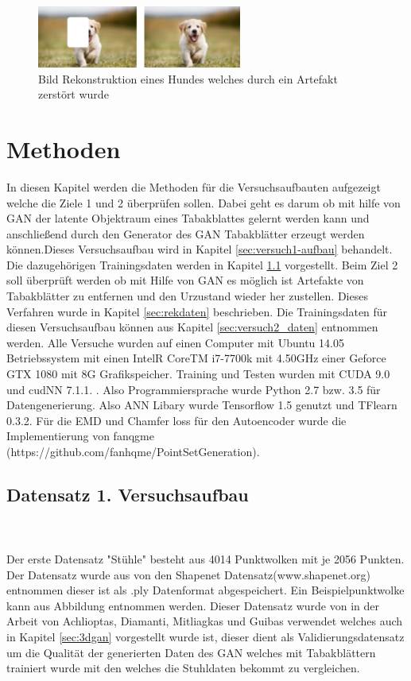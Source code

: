 \documentclass{llncs}
\begin{document}
\begin{figure}[htbp] 
	\centering
	\includegraphics[width=0.6\textwidth]{imagere.png}
	\caption{Bild Rekonstruktion eines Hundes welches durch ein Artefakt zerstört wurde}
	\label{fig:Bild40}
\end{figure}
\newpage
\section{Methoden}

In diesen Kapitel werden die Methoden für die Versuchsaufbauten aufgezeigt welche die Ziele 1 und 2 überprüfen sollen. Dabei geht es darum ob mit hilfe von GAN der latente Objektraum eines Tabakblattes gelernt werden kann und anschließend durch den Generator des GAN Tabakblätter erzeugt werden können.Dieses Versuchsaufbau wird in Kapitel \ref{sec:versuch1-aufbau} behandelt. Die dazugehörigen Trainingsdaten werden in Kapitel \ref{sec:versuch1-traingsdaten} vorgestellt. Beim Ziel 2 soll überprüft werden ob mit Hilfe von GAN es möglich ist Artefakte von Tabakblätter zu entfernen und den Urzustand wieder her zustellen.  Dieses Verfahren wurde in Kapitel \ref{sec:rekdaten} beschrieben. Die Trainingsdaten für diesen Versuchsaufbau können aus Kapitel \ref{sec:versuch2_daten} entnommen werden. Alle Versuche wurden auf einen Computer mit Ubuntu 14.05 Betriebssystem mit einen IntelR CoreTM i7-7700k mit 4.50GHz einer Geforce GTX 1080 mit 8G Grafikspeicher. Training und Testen wurden mit CUDA 9.0 und cudNN 7.1.1. . Also Programmiersprache wurde Python 2.7 bzw. 3.5 für Datengenerierung. Also ANN Libary wurde Tensorflow 1.5 genutzt und TFlearn 0.3.2. Für die EMD und Chamfer loss für den Autoencoder wurde die Implementierung von fanqgme (https://github.com/fanhqme/PointSetGeneration).


\subsection{Datensatz 1. Versuchsaufbau}\label{sec:versuch1-traingsdaten}
~\\\\
Der erste Datensatz "Stühle" besteht aus 4014 Punktwolken mit je 2056 Punkten. Der Datensatz wurde aus von den Shapenet Datensatz(www.shapenet.org) entnommen dieser ist als .ply Datenformat abgespeichert. Ein Beispielpunktwolke kann aus Abbildung entnommen werden. Dieser Datensatz wurde von  in der Arbeit von Achlioptas, Diamanti, Mitliagkas und Guibas\cite{3dgan} verwendet welches auch in Kapitel \ref{sec:3dgan} vorgestellt wurde ist, dieser dient als Validierungsdatensatz um die Qualität der generierten Daten des GAN welches mit Tabakblättern trainiert wurde mit den welches die Stuhldaten bekommt zu vergleichen. 
\end{document}
